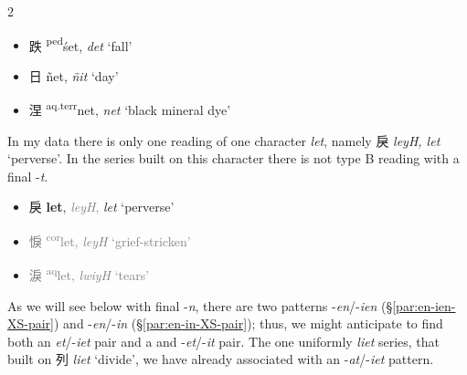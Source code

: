 \begin{multicols}{2}
\begin{itemize}
   \item {\Large{跌}} %
    {\large{{\textsuperscript{ped}}śet}},
    \textit{det} `fall' %

\end{itemize}

\medskip


\begin{itemize}
  \item {\Large{日}} %
    {\large{ñet}},
    \textit{ñit} `day' %
 

  \item {\Large{涅}} %
    {\large{{\textsuperscript{aq.terr}}net}},
    \textit{net} `black mineral dye' %
\end{itemize}
\end{multicols}


In my data there is only one reading of one character \textit{let}, namely 
戾 %
    \textit{leyH, let} `perverse'. 
In the series built on this character there is not type B reading with a final -\textit{t}. 


\begin{itemize}
  \item {\Large{戾}} %
    {\large{\textbf{let}}},
    \textcolor{gray}{\textit{leyH},} \textit{let} `perverse' %

  \item \textcolor{gray}{{\Large{悷}} %
    {\large{{\textsuperscript{cor}}let}},
    \textit{leyH} `grief-stricken'} %

  \item \textcolor{gray}{{\Large{淚}} %
    {\large{{\textsuperscript{aq}}let}},
    \textit{lwiyH} `tears'} %
\end{itemize}

\noindent As we will see below with final -\textit{n}, there are two patterns -\textit{en}/-\textit{ien} 
(§\ref{par:en-ien-XS-pair})
and -\textit{en}/-\textit{in} (§\ref{par:en-in-XS-pair}); thus, we might anticipate to find both an \textit{et}/-\textit{iet} pair and a and -\textit{et}/-\textit{it} pair.
The one uniformly  \textit{liet} series, that built on 列  \textit{liet} `divide', we have already associated with an -\textit{at}/-\textit{iet} pattern.

